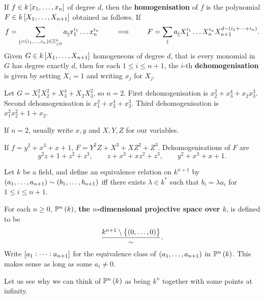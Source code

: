 \begin{definition}
If $ f \in k\sbr{x_1, \dots, x_n} $ of degree $ d $, then the \textbf{homogenisation} of $ f $ is the polynomial $ F \in k\sbr{X_1, \dots, X_{n + 1}} $ obtained as follows. If
$$ f = \sum_{\underline{i} = \br{i_1, \dots, i_n} \in \Z_{\ge 0}^n} a_{\underline{i}}x_1^{i_1} \dots x_n^{i_n} \qquad \implies \qquad F = \sum_{\underline{i}} a_{\underline{i}}X_1^{i_1} \dots X_n^{i_n}X_{n + 1}^{d - \br{i_1 + \dots + i_n}}. $$
Given $ G \in k\sbr{X_1, \dots, X_{n + 1}} $ homogeneous of degree $ d $, that is every monomial in $ G $ has degree exactly $ d $, then for each $ 1 \le i \le n + 1 $, the $ i $-th \textbf{dehomogenisation} is given by setting $ X_i = 1 $ and writing $ x_j $ for $ X_j $.
\end{definition}

\begin{example*}
Let $ G = X_1^2X_2^2 + X_3^4 + X_2X_3^2 $, so $ n = 2 $. First dehomogenisation is $ x_2^2 + x_3^4 + x_2x_3^3 $. Second dehomogenisation is $ x_1^2 + x_3^4 + x_3^3 $. Third dehomogenisation is $ x_1^2x_2^2 + 1 + x_2 $.
\end{example*}

If $ n = 2 $, usually write $ x, y $ and $ X, Y, Z $ for our variables.

\begin{example*}
If $ f = y^2 + x^3 + x + 1 $, $ F = Y^2Z + X^3 + XZ^2 + Z^3 $. Dehomogenisations of $ F $ are
$$ y^2z + 1 + z^2 + z^3, \qquad z + x^3 + xz^2 + z^3, \qquad y^2 + x^3 + x + 1. $$
\end{example*}

\pagebreak

Let $ k $ be a field, and define an equivalence relation on $ k^{n + 1} $ by $ \br{a_1, \dots, a_{n + 1}} \sim \br{b_1, \dots, b_{n + 1}} $ iff there exists $ \lambda \in k^* $ such that $ b_i = \lambda a_i $ for $ 1 \le i \le n + 1 $.

\begin{definition}
For each $ n \ge 0 $, $ \P^n\br{k} $, \textbf{the $ n $-dimensional projective space over $ k $}, is defined to be
$$ \dfrac{k^{n + 1} \setminus \cbr{\br{0, \dots, 0}}}{\sim}. $$
Write $ \sbr{a_1 : \dots : a_{n + 1}} $ for the equivalence class of $ \br{a_1, \dots, a_{n + 1}} $ in $ \P^n\br{k} $. This makes sense as long as some $ a_i \ne 0 $.
\end{definition}

Let us see why we can think of $ \P^n\br{k} $ as being $ k^n $ together with some points at infinity.

